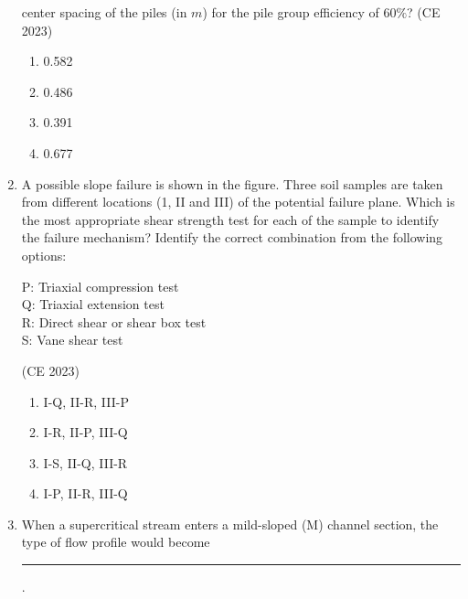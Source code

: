 \documentclass[journal,12pt,onecolumn]{IEEEtran}
\theoremstyle{remark}
\begin{document}
\begin{enumerate}
center spacing of the piles (in $m$) for the pile group efficiency of $60\%$?
\hfill{(CE 2023)}
\begin{enumerate}
\item 0.582
\item 0.486
\item 0.391
\item 0.677
\end{enumerate}
\item A possible slope failure is shown in the figure. Three soil samples are taken from different locations (1, II and III) of the potential failure plane. Which is the most appropriate shear strength test for each of the sample to identify the failure mechanism? Identify the correct combination from the following options:

\text{  } \qquad P: Triaxial compression test\\
\text{  } \qquad Q: Triaxial extension test\\
\text{  } \qquad R: Direct shear or shear box test\\
\text{  } \qquad S: Vane shear test
\begin{center}
{
}
\end{center}
\hfill{(CE 2023)}
\begin{enumerate}
\item I-Q, II-R, III-P
\item I-R, II-P, III-Q
\item I-S, II-Q, III-R
\item I-P, II-R, III-Q
\end{enumerate}
\item When a supercritical stream enters a mild-sloped (M) channel section, the type of
flow profile would become \rule{2cm}{0.4pt}.

\end{enumerate}
\end{document}
